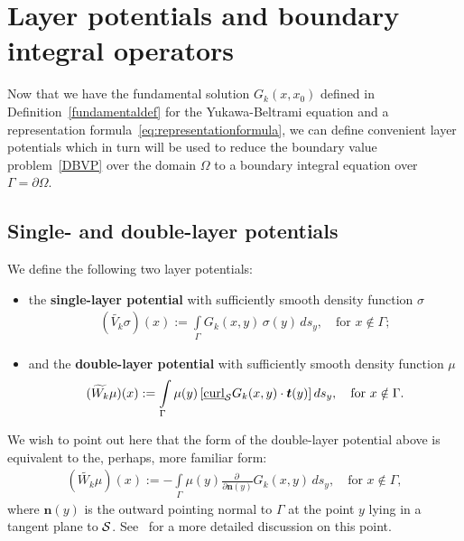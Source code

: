 \section{Layer potentials and boundary integral operators}
Now that we have the fundamental solution $G_k(x,x_0)$ defined in
Definition~\ref{fundamentaldef} for the Yukawa-Beltrami equation and a
representation formula~\eqref{eq:representationformula}, we can define
convenient layer potentials which in turn will be used to reduce the
boundary value problem~\eqref{DBVP} over the domain $\Omega$ to a
boundary integral equation over $\Gamma = \partial \Omega$.


\subsection{Single- and double-layer potentials}
We define the following two layer potentials:
\begin{itemize}
\item the {\bf single-layer potential} with sufficiently smooth density
function $\sigma$
  \begin{align}
    (\widetilde{V_k}\sigma)(x):=\int\limits_{\Gamma}
    G_k(x,y)\,\sigma(y)\,ds_y,\quad\mbox{for $x \notin \Gamma$};
    \label{singlelayerpotential}
  \end{align}
\item and the {\bf double-layer potential} with sufficiently smooth
density function $\mu$
  \begin{align}
    (\widetilde{W_k}\mu )(x):=\int\limits_{\Gamma}
    \mu(y)\,[\underline{\mbox{curl}}_{\S} G_k(x,y)\cdot \vec{t}(y)]\,
    ds_y, \quad\mbox{for $x\notin\Gamma$}.
    \label{doublelayerpotential}
  \end{align}
\end{itemize}
We wish to point out here that the form of the double-layer potential
above is equivalent to the, perhaps, more familiar form:
\begin{align*}
  (\widetilde{W_k}\mu )(x):=-\int\limits_{\Gamma}
  \mu(y) \frac{\partial \,}{\partial \mathbf{n}(y)} G_k(x,y) \,
  ds_y, \quad\mbox{for $x\notin\Gamma$},
\end{align*}
where $\mathbf{n}(y)$ is the outward pointing normal to $\Gamma$ at the
point $y$ lying in a tangent plane to $\S$.  See~\cite{kro:nig2013} for
a more detailed discussion on this point.

